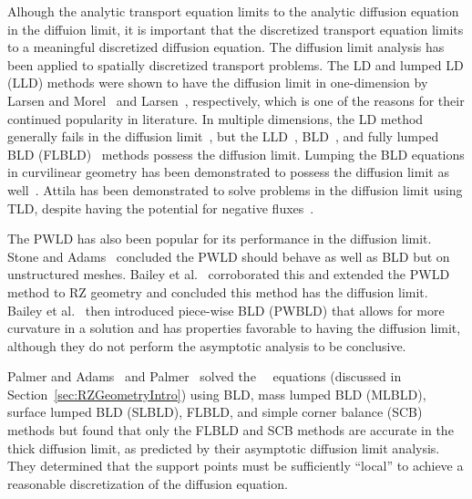 \documentclass[12pt,letterpaper]{article}
\begin{document}
Alhough the analytic transport equation limits to the analytic diffusion equation in the diffuion limit, it is important that the discretized transport equation limits to a meaningful discretized diffusion equation. The diffusion limit analysis has been applied to spatially discretized transport problems. The LD and lumped LD (LLD) methods were shown to have the diffusion limit in one-dimension by Larsen and Morel~\cite{LarsenAsymptotic} and Larsen~\cite{LarsenAsymptoticDiffusionLimit}, respectively, which is one of the reasons for their continued popularity in literature. In multiple dimensions, the LD method generally fails in the diffusion limit~\cite{BorgersAsymptoticDiffLimit}, but the LLD~\cite{MorelLLDrz, MorelLLDTetrahedral}, BLD~\cite{Adams_Disc_FEM_Thick_Diff}, and fully lumped BLD (FLBLD)~\cite{AdamsDFEMDiffLimit} methods possess the diffusion limit. Lumping the BLD equations in curvilinear geometry has been demonstrated to possess the diffusion limit as well~\cite{PalmerCurvilinearTransport, MorelLBLD}. Attila has been demonstrated to solve problems in the diffusion limit using TLD, despite having the potential for negative fluxes~\cite{AttilaUsersManual}.

The PWLD has also been popular for its performance in the diffusion limit. Stone and Adams~\cite{StonePLFEM} concluded the PWLD should behave as well as BLD but on unstructured meshes. Bailey et al.~\cite{BaileyDFEMCylindrical, BaileyDissertation} corroborated this and extended the PWLD method to RZ geometry and concluded this method has the diffusion limit. Bailey et al.~\cite{BaileyBLDFEM} then introduced piece-wise BLD (PWBLD) that allows for more curvature in a solution and has properties favorable to having the diffusion limit, although they do not perform the asymptotic analysis to be conclusive.

Palmer and Adams~\cite{PalmerCurvilinearTransport} and Palmer~\cite{PalmerDissertation} solved the \RZ\ \SN\ equations (discussed in Section~\ref{sec:RZGeometryIntro}) using BLD, mass lumped BLD (MLBLD), surface lumped BLD (SLBLD), FLBLD, and simple corner balance (SCB) methods but found that only the FLBLD and SCB methods are accurate in the thick diffusion limit, as predicted by their asymptotic diffusion limit analysis. They determined that the support points must be sufficiently ``local'' to achieve a reasonable discretization of the diffusion equation.
\end{document}
